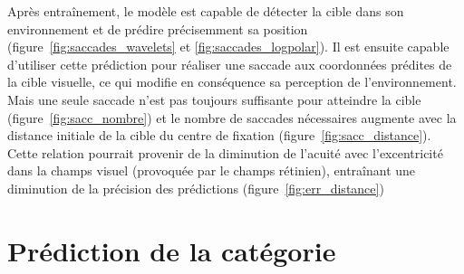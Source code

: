 Après entraînement, le modèle est capable de détecter la cible dans son environnement et de prédire précisemment sa position (figure~\ref{fig:saccades_wavelets} et \ref{fig:saccades_logpolar}). Il est ensuite capable d'utiliser cette prédiction pour réaliser une saccade aux coordonnées prédites de la cible visuelle, ce qui modifie en conséquence sa perception de l'environnement.\\
Mais une seule saccade n'est pas toujours suffisante pour atteindre la cible (figure~\ref{fig:sacc_nombre}) et le nombre de saccades nécessaires augmente avec la distance initiale de la cible du centre de fixation (figure~\ref{fig:sacc_distance}). Cette relation pourrait provenir de la diminution de l'acuité avec l'excentricité dans la champs visuel (provoquée par le champs rétinien), entraînant une diminution de la précision des prédictions (figure~\ref{fig:err_distance})


\section{Prédiction de la catégorie}

